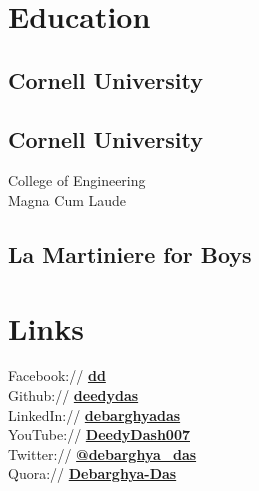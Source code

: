 \documentclass[]{deedy-resume-openfont}
\begin{document}
%
%
\lastupdated

%
%

%
%

\begin{minipage}[t]{0.33\textwidth} 


\section{Education} 

\subsection{Cornell University}
\sectionsep

\subsection{Cornell University}
College of Engineering \\
Magna Cum Laude\\
\sectionsep

\subsection{La Martiniere for Boys}
\sectionsep


\section{Links} 
Facebook:// \href{https://facebook/dd}{\bf dd} \\
Github:// \href{https://github.com/deedydas}{\bf deedydas} \\
LinkedIn://  \href{https://www.linkedin.com/in/debarghyadas}{\bf debarghyadas} \\
YouTube://  \href{https://www.youtube.com/user/DeedyDash007}{\bf DeedyDash007} \\
Twitter://  \href{https://twitter.com/debarghya_das}{\bf @debarghya\_das} \\
Quora://  \href{https://www.quora.com/Debarghya-Das}{\bf Debarghya-Das}


\end{minipage}
\end{document}
